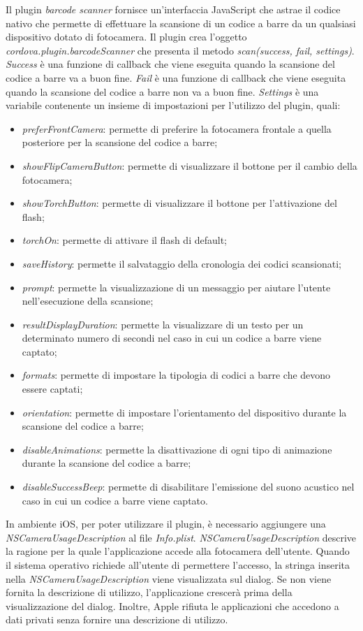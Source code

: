 Il plugin \textit{barcode scanner} fornisce un'interfaccia JavaScript che astrae il codice nativo che permette di effettuare la scansione di un codice a barre da un qualsiasi dispositivo dotato di fotocamera. Il plugin crea l'oggetto \textit{cordova.plugin.barcodeScanner} che presenta il metodo \textit{scan(success, fail, settings)}. \textit{Success} è una funzione di callback che viene eseguita quando la scansione del codice a barre va a buon fine. \textit{Fail} è una funzione di callback che viene eseguita quando la scansione del codice a barre non va a buon fine. \textit{Settings} è una variabile contenente un insieme di impostazioni per l'utilizzo del plugin, quali:
\begin{itemize}
	\item \textit{preferFrontCamera}: permette di preferire la fotocamera frontale a quella posteriore per la scansione del codice a barre;
	\item \textit{showFlipCameraButton}: permette di visualizzare il bottone per il cambio della fotocamera;
	\item \textit{showTorchButton}: permette di visualizzare il bottone per l'attivazione del flash;
	\item \textit{torchOn}: permette di attivare il flash di default;
	\item \textit{saveHistory}: permette il salvataggio della cronologia dei codici scansionati;
	\item \textit{prompt}: permette la visualizzazione di un messaggio per aiutare l'utente nell'esecuzione della scansione;
	\item \textit{resultDisplayDuration}: permette la visualizzare di un testo per un determinato numero di secondi nel caso in cui un codice a barre viene captato;
	\item \textit{formats}: permette di impostare la tipologia di codici a barre che devono essere captati;
	\item \textit{orientation}: permette di impostare l'orientamento del dispositivo durante la scansione del codice a barre;
	\item \textit{disableAnimations}: permette la disattivazione di ogni tipo di animazione durante la scansione del codice a barre;
	\item \textit{disableSuccessBeep}: permette di disabilitare l'emissione del suono acustico nel caso in cui un codice a barre viene captato.
\end{itemize}
In ambiente iOS, per poter utilizzare il plugin, è necessario aggiungere una \textit{NSCameraUsageDescription} al file \textit{Info.plist}. \textit{NSCameraUsageDescription} descrive la ragione per la quale l'applicazione accede alla fotocamera dell'utente. Quando il sistema operativo richiede all'utente di permettere l'accesso, la stringa inserita nella \textit{NSCameraUsageDescription} viene visualizzata sul dialog. Se non viene fornita la descrizione di utilizzo, l'applicazione crescerà prima della visualizzazione del dialog. Inoltre, Apple rifiuta le applicazioni che accedono a dati privati senza fornire una descrizione di utilizzo. 

